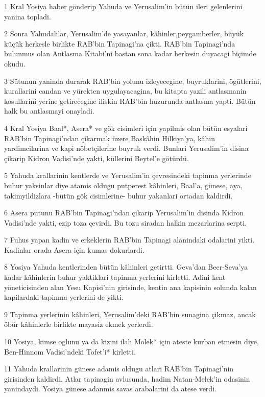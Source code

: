 \par 1 Kral Yosiya haber gönderip Yahuda ve Yerusalim'in bütün ileri gelenlerini yanina topladi.
\par 2 Sonra Yahudalilar, Yerusalim'de yasayanlar, kâhinler,peygamberler, büyük küçük herkesle birlikte RAB'bin Tapinagi'na çikti. RAB'bin Tapinagi'nda bulunmus olan Antlasma Kitabi'ni bastan sona kadar herkesin duyacagi biçimde okudu.
\par 3 Sütunun yaninda durarak RAB'bin yolunu izleyecegine, buyruklarini, ögütlerini, kurallarini candan ve yürekten uygulayacagina, bu kitapta yazili antlasmanin kosullarini yerine getirecegine iliskin RAB'bin huzurunda antlasma yapti. Bütün halk bu antlasmayi onayladi.
\par 4 Kral Yosiya Baal*, Asera* ve gök cisimleri için yapilmis olan bütün esyalari RAB'bin Tapinagi'ndan çikarmak üzere Baskâhin Hilkiya'ya, kâhin yardimcilarina ve kapi nöbetçilerine buyruk verdi. Bunlari Yerusalim'in disina çikarip Kidron Vadisi'nde yakti, küllerini Beytel'e götürdü.
\par 5 Yahuda krallarinin kentlerde ve Yerusalim'in çevresindeki tapinma yerlerinde buhur yaksinlar diye atamis oldugu putperest kâhinleri, Baal'a, günese, aya, takimyildizlara -bütün gök cisimlerine- buhur yakanlari ortadan kaldirdi.
\par 6 Asera putunu RAB'bin Tapinagi'ndan çikarip Yerusalim'in disinda Kidron Vadisi'nde yakti, ezip toza çevirdi. Bu tozu siradan halkin mezarlarina serpti.
\par 7 Fuhus yapan kadin ve erkeklerin RAB'bin Tapinagi alanindaki odalarini yikti. Kadinlar orada Asera için kumas dokurlardi.
\par 8 Yosiya Yahuda kentlerinden bütün kâhinleri getirtti. Geva'dan Beer-Seva'ya kadar kâhinlerin buhur yaktiklari tapinma yerlerini kirletti. Adini kent yöneticisinden alan Yesu Kapisi'nin girisinde, kentin ana kapisinin solunda kalan kapilardaki tapinma yerlerini de yikti.
\par 9 Tapinma yerlerinin kâhinleri, Yerusalim'deki RAB'bin sunagina çikmaz, ancak öbür kâhinlerle birlikte mayasiz ekmek yerlerdi.
\par 10 Yosiya, kimse oglunu ya da kizini ilah Molek* için ateste kurban etmesin diye, Ben-Hinnom Vadisi'ndeki Tofet'i* kirletti.
\par 11 Yahuda krallarinin günese adamis oldugu atlari RAB'bin Tapinagi'nin girisinden kaldirdi. Atlar tapinagin avlusunda, hadim Natan-Melek'in odasinin yanindaydi. Yosiya günese adanmis savas arabalarini da atese verdi.
